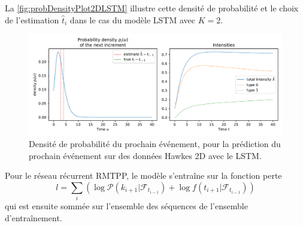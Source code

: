 \documentclass[../main.tex]{subfiles}
\begin{document}
La \autoref{fig:probDensityPlot2DLSTM} illustre cette densité de probabilité et le choix de l'estimation $\hat{t}_i$ dans le cas du modèle LSTM avec $K=2$.

\begin{figure}[!ht]
	\centering
	\includegraphics[width=\linewidth]{../notebooks/lstm_2d_prediction_graphs.pdf}
	\caption{Densité de probabilité du prochain événement, pour la prédiction du prochain événement sur des données Hawkes 2D avec le LSTM.}\label{fig:probDensityPlot2DLSTM}
\end{figure}

Pour le réseau récurrent RMTPP, le modèle s'entraîne sur la fonction perte
\begin{equation}
l =  \sum_i(\log\mathcal{P}(k_{i+1} | \mathcal{F}_{t_{i-1}}) + \log f(t_{i+1}|  \mathcal{F}_{t_{i-1}}   )  )
\end{equation}
qui est ensuite sommée sur l'ensemble des séquences de l'ensemble d'entraînement.
\end{document}
